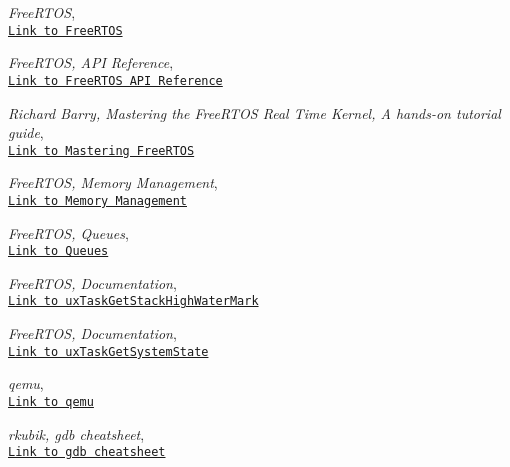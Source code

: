 \documentclass[12pt,a4paper]{article}
\begin{document}
\begin{thebibliography}{9}
\emph{FreeRTOS},
\\\texttt{\href{https://www.freertos.org/}{Link to FreeRTOS}}

\emph{FreeRTOS, API Reference},
\\\texttt{\href{https://www.freertos.org/a00106.html}{Link to FreeRTOS API Reference}}

\emph{Richard Barry, Mastering the FreeRTOS Real Time Kernel, A hands-on tutorial guide},
\\\texttt{\href{https://www.freertos.org/wp-content/uploads/2018/07/161204_Mastering_the_FreeRTOS_Real_Time_Kernel-A_Hands-On_Tutorial_Guide.pdf}{Link to Mastering FreeRTOS}}

\emph{FreeRTOS, Memory Management},
\\\texttt{\href{https://www.freertos.org/a00111.html}{Link to Memory Management}}

\emph{FreeRTOS, Queues},
\\\texttt{\href{https://www.freertos.org/Embedded-RTOS-Queues.html}{Link to Queues}}

\emph{FreeRTOS, Documentation},
\\\texttt{\href{https://www.freertos.org/uxTaskGetStackHighWaterMark.html}{Link to uxTaskGetStackHighWaterMark}}

\emph{FreeRTOS, Documentation},
\\\texttt{\href{https://www.freertos.org/uxTaskGetSystemState.html}{Link to uxTaskGetSystemState}}

\emph{qemu},
\\\texttt{\href{https://www.qemu.org/}{Link to qemu}}

\emph{rkubik, gdb cheatsheet},
\\\texttt{\href{https://gist.github.com/rkubik/b96c23bd8ed58333de37f2b8cd052c30}{Link to gdb cheatsheet}}
\end{thebibliography}
\end{document}
